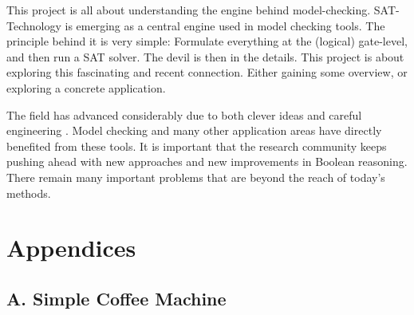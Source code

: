 \documentclass[a4paper,10pt]{report}
\begin{document}
This project is all about understanding the engine behind model-checking. SAT-Technology is emerging as a central engine used in model checking tools. The principle behind it is very simple: Formulate everything at the (logical) gate-level, and then run a SAT solver. The devil is then in the details. This project is about exploring this fascinating and recent connection. Either gaining some overview, or exploring a concrete application.

The field has advanced considerably due to both clever ideas and careful engineering \cite{Bryant1986}. Model checking and many other application areas have directly benefited from these tools. It is important that the research community keeps pushing ahead with new approaches and new improvements in Boolean reasoning. There remain many important problems that are beyond the reach of today's methods.






\chapter{Appendices}
\label{Appendices}
\section{A. Simple Coffee Machine}\cite{Boyatt}
\end{document}
